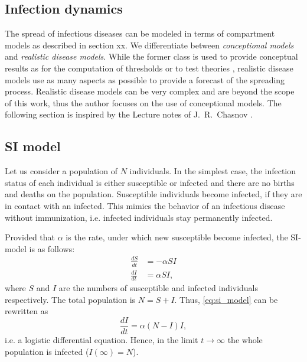 \documentclass[openright,twoside,headsepline]{scrbook}
\begin{document}
\subsection{Infection dynamics}

The spread of infectious diseases can be modeled in terms of compartment models as described in section xx.
We differentiate between \emph{conceptional models} and \emph{realistic disease models}.
While the former class is used to provide conceptual results as for the computation of thresholds or to test theories \cite{Hethcote:2000}, realistic disease models use as many aspects as possible to provide a forecast of the spreading process.
Realistic disease models can be very complex and are beyond the scope of this work, thus the author focuses on the use of conceptional models.
The following section is inspired by the Lecture notes of J.~R.~Chasnov \cite{Chasnov:2010}.

\subsection{SI model}\label{sec:si_model}
Let us consider a population of $N$ individuals.
In the simplest case, the infection status of each individual is either susceptible or infected and there are no births and deaths on the population.
Susceptible individuals become infected, if they are in contact with an infected.
This mimics the behavior of an infectious disease without immunization, i.e. infected individuals stay permanently infected.

Provided that $\alpha $ is the rate, under which new susceptible become infected, the SI-model is as follows:
\begin{align}\label{eq:si_model}
\frac{dS}{dt} &= -\alpha SI \nonumber \\
\frac{dI}{dt} &= \alpha SI,
\end{align}
where $S$ and $I$ are the numbers of susceptible and infected individuals respectively.
The total population is $N=S+I$.
Thus, \eqref{eq:si_model} can be rewritten as
$$
\frac{dI}{dt}=\alpha (N-I)I,
$$
i.e. a logistic differential equation.
Hence, in the limit $t\rightarrow \infty $ the whole population is infected ($I(\infty )=N$). 
\end{document}
